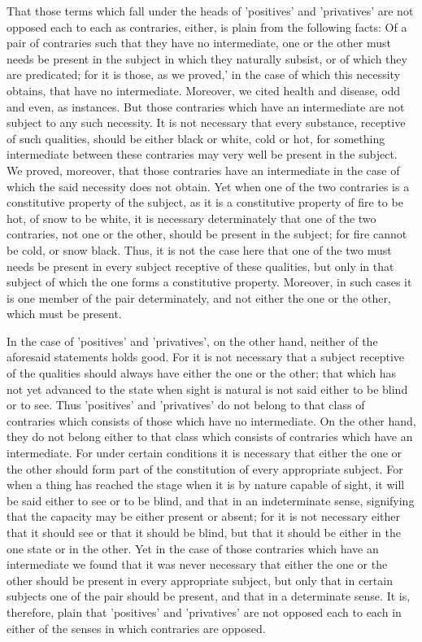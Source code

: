 That those terms which fall under the heads of 'positives' and
'privatives' are not opposed each to each as contraries, either, is
plain from the following facts: Of a pair of contraries such that they
have no intermediate, one or the other must needs be present in the
subject in which they naturally subsist, or of which they are
predicated; for it is those, as we proved,' in the case of which this
necessity obtains, that have no intermediate. Moreover, we cited health
and disease, odd and even, as instances. But those contraries which
have an intermediate are not subject to any such necessity. It is not
necessary that every substance, receptive of such qualities, should be
either black or white, cold or hot, for something intermediate between
these contraries may very well be present in the subject. We proved,
moreover, that those contraries have an intermediate in the case of
which the said necessity does not obtain. Yet when one of the two
contraries is a constitutive property of the subject, as it is a
constitutive property of fire to be hot, of snow to be white, it is
necessary determinately that one of the two contraries, not one or the
other, should be present in the subject; for fire cannot be cold, or
snow black. Thus, it is not the case here that one of the two must
needs be present in every subject receptive of these qualities, but
only in that subject of which the one forms a constitutive property.
Moreover, in such cases it is one member of the pair determinately, and
not either the one or the other, which must be present.

In the case of 'positives' and 'privatives', on the other hand, neither
of the aforesaid statements holds good. For it is not necessary that a
subject receptive of the qualities should always have either the one or
the other; that which has not yet advanced to the state when sight is
natural is not said either to be blind or to see. Thus 'positives' and
'privatives' do not belong to that class of contraries which consists
of those which have no intermediate. On the other hand, they do not
belong either to that class which consists of contraries which have an
intermediate. For under certain conditions it is necessary that either
the one or the other should form part of the constitution of every
appropriate subject. For when a thing has reached the stage when it is
by nature capable of sight, it will be said either to see or to be
blind, and that in an indeterminate sense, signifying that the capacity
may be either present or absent; for it is not necessary either that it
should see or that it should be blind, but that it should be either in
the one state or in the other. Yet in the case of those contraries
which have an intermediate we found that it was never necessary that
either the one or the other should be present in every appropriate
subject, but only that in certain subjects one of the pair should be
present, and that in a determinate sense. It is, therefore, plain that
'positives' and 'privatives' are not opposed each to each in either of
the senses in which contraries are opposed.

